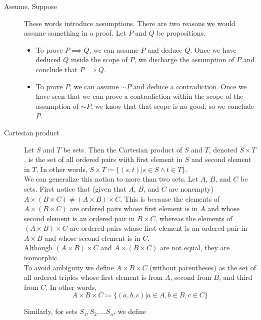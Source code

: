 \documentclass[12pt]{article}
\newcommand*{\oldneg}{\mathord{\sim}}
\begin{document}
\begin{description}

  \item[Assume, Suppose] These words introduce assumptions.  There are
    two reasons we would assume something in a proof.  Let $P$ and $Q$
    be propositions.
    \begin{itemize}
      \item To prove $P\implies Q$, we can assume $P$ and deduce $Q$.
        Once we have deduced $Q$ inside the scope of $P$, we discharge
        the assumption of $P$ and conclude that $P\implies Q$.
      \item To prove $P$, we can assume $\oldneg P$ and deduce a
        contradiction.  Once we have seen that we can prove a
        contradiction within the scope of the assumption of $\oldneg
        P$, we know that that scope is no good, so we conclude $P$.
    \end{itemize}
  
  \item[Cartesian product] Let $S$ and $T$ be sets.  Then the
    Cartesian product of $S$ and $T$, denoted $S\times T$, is the set
    of all ordered pairs wiith first element in $S$ and second element
    in $T$.  In other words, $S\times T\coloneqq \{(s,t)|s\in S\wedge
    t\in T\}$.\\

    We can generalize this notion to more than two sets.  Let $A$,
    $B$, and $C$ be sets.  First notice that (given that $A$, $B$, and
    $C$ are nonempty) $A\times (B\times C)\neq (A\times B)\times C$.
    This is because the elements of $A\times (B\times C)$ are ordered
    pairs whose first element is in $A$ and whose second element is an
    ordered pair in $B\times C$, whereas the elements of $(A\times
    B)\times C$ are ordered pairs whose first element is an ordered
    pair in $A\times B$ and whose second element is in $C$.\\

    Although $(A\times B)\times C$ and $A\times (B\times C)$ are not
    equal, they are isomorphic. \\

    To avoid ambiguity we define $A\times B\times C$ (without
    parentheses) as the set of all ordered triples whose first element
    is from $A$, second from $B$, and third from $C$.  In other
    words, $$A\times B\times C \coloneqq \{(a,b,c)|a\in A, b\in B,
    c\in C\}$$

    Similarly, for sets $S_1,S_2,\ldots S_n$, we define


\end{description}
\end{document}
